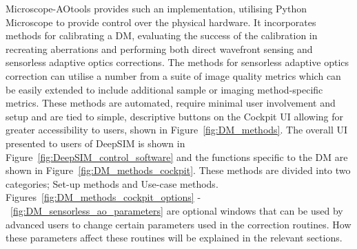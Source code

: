 Microscope-AOtools provides such an implementation, utilising Python Microscope to provide control over the physical hardware. It incorporates methods for calibrating a DM, evaluating the success of the calibration in recreating aberrations and performing both direct wavefront sensing and sensorless adaptive optics corrections. The methods for sensorless adaptive optics correction can utilise a number from a suite of image quality metrics which can be easily extended to include additional sample or imaging method-specific metrics. These methods are automated, require minimal user involvement and setup and are tied to simple, descriptive  buttons on the Cockpit UI allowing for greater accessibility to users, shown in Figure~\ref{fig:DM_methods}. The overall UI presented to users of DeepSIM is shown in Figure~\ref{fig:DeepSIM_control_software} and the functions specific to the DM are shown in Figure~\ref{fig:DM_methods_cockpit}. These methods are divided into two categories; Set-up methods and Use-case methods. Figures~\ref{fig:DM_methods_cockpit_options} -~\ref{fig:DM_sensorless_ao_parameters} are optional windows that can be used by advanced users to change certain parameters used in the correction routines. How these parameters affect these routines will be explained in the relevant sections.

